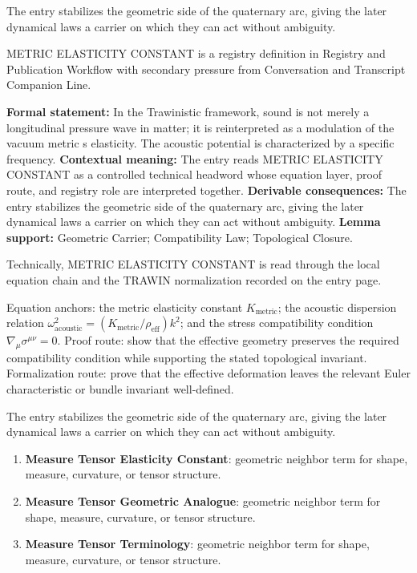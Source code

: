 The entry stabilizes the geometric side of the quaternary arc, giving the later dynamical laws a carrier on which they can act without ambiguity.
\clearpage


\begingroup\small
{}
METRIC ELASTICITY CONSTANT is a registry definition in Registry and Publication Workflow with secondary pressure from Conversation and Transcript Companion Line.

\begingroup\footnotesize\setlength{\emergencystretch}{3em}\sloppy
\textbf{Formal statement:} In the Trawinistic framework, sound is not merely a longitudinal pressure wave in matter; it is reinterpreted as a modulation of the vacuum metric s elasticity. The acoustic potential is characterized by a specific frequency. \textbf{Contextual meaning:} The entry reads METRIC ELASTICITY CONSTANT as a controlled technical headword whose equation layer, proof route, and registry role are interpreted together. \textbf{Derivable consequences:} The entry stabilizes the geometric side of the quaternary arc, giving the later dynamical laws a carrier on which they can act without ambiguity. \textbf{Lemma support:} Geometric Carrier; Compatibility Law; Topological Closure.\par
\endgroup

Technically, METRIC ELASTICITY CONSTANT is read through the local equation chain and the TRAWIN normalization recorded on the entry page.

Equation anchors: the metric elasticity constant \(K_{\mathrm{metric}}\); the acoustic dispersion relation \(\omega_{\mathrm{acoustic}}^2=(K_{\mathrm{metric}}/\rho_{\mathrm{eff}})k^2\); and the stress compatibility condition \(\nabla_\mu\sigma^{\mu\nu}=0\). Proof route: show that the effective geometry preserves the required compatibility condition while supporting the stated topological invariant. Formalization route: prove that the effective deformation leaves the relevant Euler characteristic or bundle invariant well-defined.

The entry stabilizes the geometric side of the quaternary arc, giving the later dynamical laws a carrier on which they can act without ambiguity.
\endgroup

\begin{enumerate}[leftmargin=1.6em,itemsep=6pt,topsep=4pt]
\item \textbf{Measure Tensor Elasticity Constant}: geometric neighbor term for shape, measure, curvature, or tensor structure.
\item \textbf{Measure Tensor Geometric Analogue}: geometric neighbor term for shape, measure, curvature, or tensor structure.
\item \textbf{Measure Tensor Terminology}: geometric neighbor term for shape, measure, curvature, or tensor structure.
\end{enumerate}

